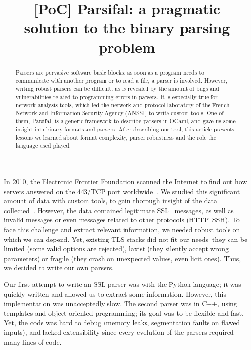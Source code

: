 \documentclass[conference]{IEEEtran}
\title{[PoC] Parsifal: a pragmatic solution to the binary parsing problem}
\author{
  \IEEEauthorblockN{Olivier Levillain}
  \IEEEauthorblockA{French Network and Information Security Agency (ANSSI) \\
    \url{https://github.com/ANSSI-FR} \\
    \url{firstname.lastname@ssi.gouv.fr}}
}
\date{}
\begin{document}
\maketitle

\begin{abstract}
  Parsers are pervasive software basic blocks: as soon as a program
  needs to communicate with another program or to read a file, a
  parser is involved. However, writing robust parsers can be
  difficult, as is revealed by the amount of bugs and vulnerabilities
  related to programming errors in parsers. It is
  especially true for network analysis tools, which led the network
  and protocol laboratory of the French Network and Information
  Security Agency (ANSSI) to write custom tools. One of them,
  Parsifal, is a generic framework to describe parsers in
  OCaml, and gave us some insight into binary formats and
  parsers. After describing our tool, this article presents lessons we
  learned about format complexity, parser robustness and the role the
  language used played.
\end{abstract}




In 2010, the Electronic Frontier Foundation scanned the Internet to
find out how servers answered on the 443/TCP port
worldwide~\cite{eff-observatory, eckersley-obs1, eckersley-obs2}. We
studied this significant amount of data with custom tools, to gain
thorough insight of the data collected~\cite{acsac2012}. However, the
data contained legitimate SSL~\cite{rfc5246} messages, as well as
invalid messages or even messages related to other protocols (HTTP,
SSH). To face this challenge and extract relevant information, we
needed robust tools on which we can depend. Yet, existing TLS stacks
did not fit our needs: they can be limited (some valid options are
rejected), laxist (they silently accept wrong parameters) or fragile
(they crash on unexpected values, even licit ones). Thus, we decided
to write our own parsers.

Our first attempt to write an SSL parser was with the Python language;
it was quickly written and allowed us to extract some
information. However, this implementation was unacceptedly slow. The
second parser was in C++, using templates and object-oriented
programming; its goal was to be flexible and fast. Yet, the code was
hard to debug (memory leaks, segmentation faults on flawed inputs),
and lacked extensibility since every evolution of the parsers required
many lines of code.
\end{document}
